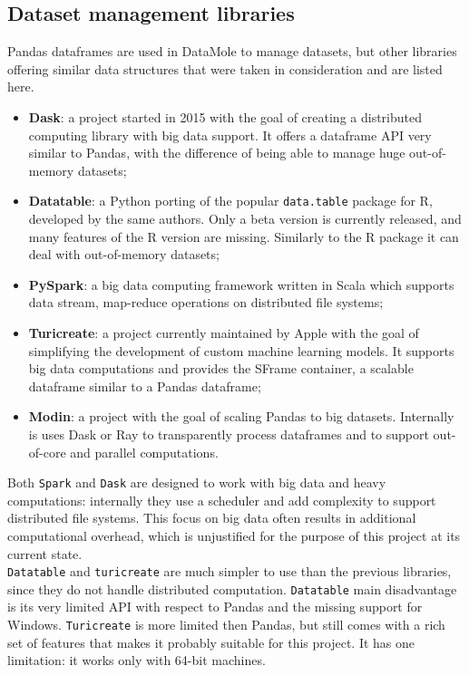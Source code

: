 \subsection{Dataset management libraries}\label{ssec:dataset-manag}
Pandas dataframes are used in DataMole to manage datasets, but other libraries offering similar data structures that were taken in consideration and are listed here.
\begin{itemize}
	\item \textbf{Dask}: a project started in 2015 with the goal of creating a distributed computing library with big data support. It offers a dataframe API very similar to Pandas, with the difference of being able to manage huge out-of-memory datasets;
	\item \textbf{Datatable}: a Python porting of the popular \texttt{data.table} package for R, developed by the same authors. Only a beta version is currently released, and many features of the R version are missing. Similarly to the R package it can deal with out-of-memory datasets;
	\item \textbf{PySpark}: a big data computing framework written in Scala which supports data stream, map-reduce operations on distributed file systems;
	\item \textbf{Turicreate}: a project currently maintained by Apple with the goal of simplifying the development of custom machine learning models. It supports big data computations and provides the SFrame container, a scalable dataframe similar to a Pandas dataframe;
	\item \textbf{Modin}: a project with the goal of scaling Pandas to big datasets. Internally is uses Dask or Ray to transparently process dataframes and to support out-of-core and parallel computations.
\end{itemize}
Both \texttt{Spark} and \texttt{Dask} are designed to work with big data and heavy computations: internally they use a scheduler and add complexity to support distributed file systems. This focus on big data often results in additional computational overhead, which is unjustified for the purpose of this project at its current state.\\ 
\texttt{Datatable} and \texttt{turicreate} are much simpler to use than the previous libraries, since they do not handle distributed computation. \texttt{Datatable} main disadvantage is its very limited API with respect to Pandas and the missing support for Windows. \texttt{Turicreate} is more limited then Pandas, but still comes with a rich set of features that makes it probably suitable for this project. It has one limitation: it works only with 64-bit machines. \\
